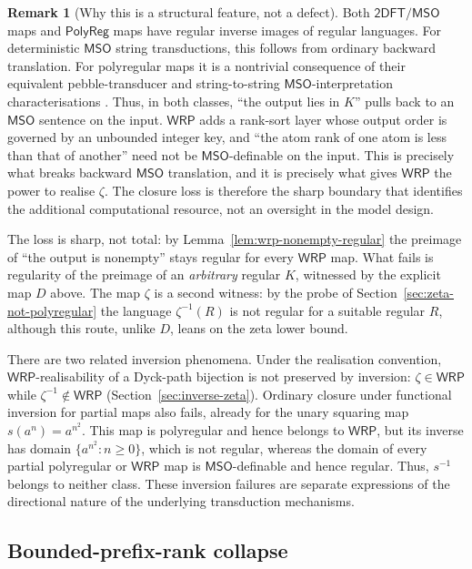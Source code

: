 \documentclass[11pt]{article}
\theoremstyle{definition}
\newtheorem{remark}[theorem]{Remark}
\newcommand{\WRP}{\mathsf{WRP}}
\newcommand{\TDFT}{\mathsf{2DFT}}
\newcommand{\MSO}{\mathsf{MSO}}
\newcommand{\polyreg}{\mathsf{PolyReg}}
\begin{document}
\begin{remark}[Why this is a structural feature, not a defect]
Both $\TDFT/\MSO$ maps and $\polyreg$ maps have regular inverse
images of regular languages.  For deterministic $\MSO$ string transductions,
this follows from ordinary backward translation.  For polyregular maps it is
a nontrivial consequence of their equivalent pebble-transducer and
string-to-string $\MSO$-interpretation characterisations
\cite{Bojanczyk2018,BojanczykKieferLhote2019}.  Thus, in both classes, ``the
output lies in $K$'' pulls back to an $\MSO$ sentence on the input.  $\WRP$
adds a rank-sort layer whose
output order is governed by an unbounded integer key, and ``the atom rank of
one atom is less than that of another'' need not be $\MSO$-definable
on the input.  This is precisely what breaks backward $\MSO$
translation, and it is precisely what gives $\WRP$ the power to
realise $\zeta$.  The closure loss is therefore the sharp boundary that
identifies the additional computational resource, not an oversight in
the model design.

The loss is sharp, not total: by Lemma~\ref{lem:wrp-nonempty-regular} the
preimage of ``the output is nonempty'' stays regular for every $\WRP$
map.  What fails is regularity of the preimage of an \emph{arbitrary}
regular $K$, witnessed by the explicit map $D$ above.  The map $\zeta$
is a second witness: by the probe of Section~\ref{sec:zeta-not-polyregular} the
language $\zeta^{-1}(R)$ is not regular for a suitable regular $R$, although
this route, unlike $D$, leans on the zeta lower bound.

There are two related inversion phenomena.  Under the realisation convention,
$\WRP$-realisability of a Dyck-path bijection is not preserved by inversion:
$\zeta\in\WRP$ while $\zeta^{-1}\notin\WRP$
(Section~\ref{sec:inverse-zeta}).  Ordinary closure under functional inversion
for partial maps also fails, already for the unary squaring map
$s(a^n)=a^{n^2}$.  This map is polyregular and hence belongs to $\WRP$, but its
inverse has domain $\{a^{n^2}:n\ge0\}$, which is not regular, whereas the
domain of every partial polyregular or $\WRP$ map is $\MSO$-definable and hence
regular.  Thus, $s^{-1}$ belongs to neither class.  These inversion failures
are separate expressions of the directional nature of the underlying
transduction mechanisms.
\end{remark}

\subsection{Bounded-prefix-rank collapse}
\end{document}
